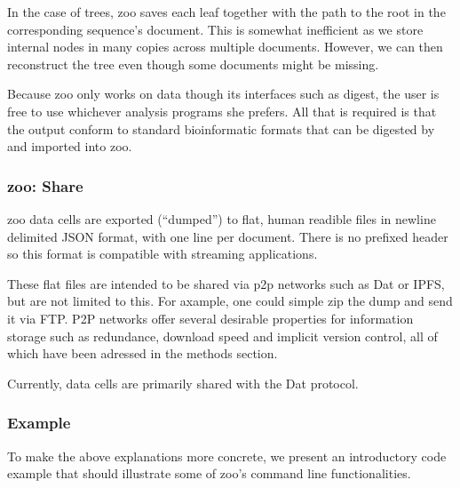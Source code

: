 In the case of trees, zoo saves each leaf together with the path to the root in the corresponding sequence’s document. This is somewhat inefficient as we store internal nodes in many copies across multiple documents. However, we can then reconstruct the tree even though some documents might be missing.

Because zoo only works on data though its interfaces such as digest, the user is free to use whichever analysis programs she prefers. All that is required is that the output conform to standard bioinformatic formats that can be digested by and imported into zoo.


\subsubsection{zoo: Share}

zoo data cells are exported (``dumped'') to flat, human readible files in newline delimited JSON format, with one line per document. There is no prefixed header so this format is compatible with streaming applications.

These flat files are intended to be shared via \gls{p2p} networks such as Dat or IPFS, but are not limited to this. For axample, one could simple zip the dump and send it via FTP. P2P networks offer several desirable properties for information storage such as redundance, download speed and implicit version control, all of which have been adressed in the methods section.

Currently, data cells are primarily shared with the Dat protocol.


\subsubsection{Example}

To make the above explanations more concrete, we present an introductory code example that should illustrate some of zoo's command line functionalities.


